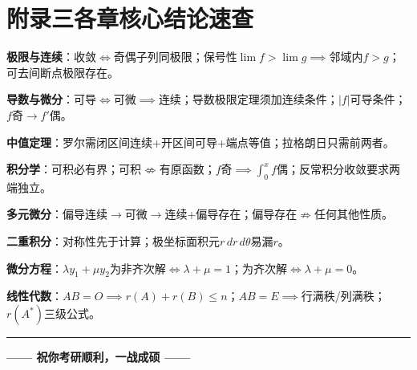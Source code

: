 \documentclass[12pt,a4paper]{ctexbook}
\begin{document}
\newpage

\chapter*{附录三\quad 各章核心结论速查}

\textbf{极限与连续}：收敛$\iff$奇偶子列同极限；保号性$\lim f>\lim g\implies$邻域内$f>g$；可去间断点极限存在。

\textbf{导数与微分}：可导$\iff$可微$\implies$连续；导数极限定理须加连续条件；$|f|$可导条件；$f$奇$\to f'$偶。

\textbf{中值定理}：罗尔需闭区间连续+开区间可导+端点等值；拉格朗日只需前两者。

\textbf{积分学}：可积必有界；可积$\not\iff$有原函数；$f$奇$\implies\int_0^x f$偶；反常积分收敛要求两端独立。

\textbf{多元微分}：偏导连续$\to$可微$\to$连续+偏导存在；偏导存在$\not\Rightarrow$任何其他性质。

\textbf{二重积分}：对称性先于计算；极坐标面积元$r\,dr\,d\theta$易漏$r$。

\textbf{微分方程}：$\lambda y_1+\mu y_2$为非齐次解$\iff\lambda+\mu=1$；为齐次解$\iff\lambda+\mu=0$。

\textbf{线性代数}：$AB=O\implies r(A)+r(B)\leqslant n$；$AB=E\implies$行满秩/列满秩；$r(A^*)$三级公式。

\vspace{2cm}
\begin{center}
\rule{0.5\textwidth}{0.3pt}\vspace{0.5cm}
{\large\color{gray}\textbf{—— 祝你考研顺利，一战成硕 ——}}
\end{center}
\end{document}

